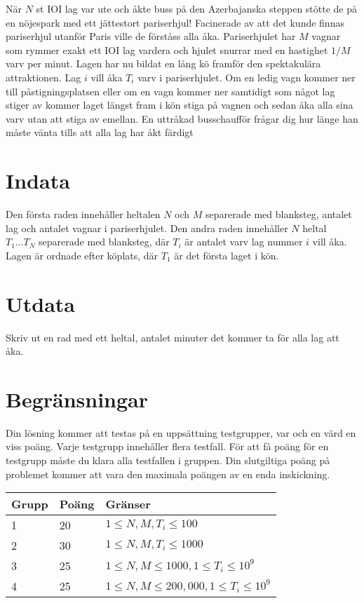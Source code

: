 När $N$ st IOI lag var ute och åkte buss på den Azerbajanska steppen stötte de på en nöjespark med ett jättestort pariserhjul! Facinerade av att det kunde finnas pariserhjul utanför Paris ville de förståss alla åka. Pariserhjulet har $M$ vagnar som rymmer exakt ett IOI lag vardera och hjulet snurrar med en hastighet $1/M$ varv per minut. Lagen har nu bildat en lång kö framför den spektakulära attraktionen. Lag $i$ vill åka $T_i$ varv i pariserhjulet. Om en ledig vagn kommer ner till påstigningsplatsen eller om en vagn kommer ner samtidigt som något lag stiger av kommer laget längst fram i kön stiga på vagnen och sedan åka alla sina varv utan att stiga av emellan.
En uttråkad busschaufför frågar dig hur länge han måste vänta tills att alla lag har åkt färdigt

\section*{Indata}
Den första raden innehåller heltalen $N$ och $M$ separerade med blanksteg,
antalet lag och antalet vagnar i pariserhjulet.
Den andra raden innehåller $N$ heltal $T_1 ... T_N$ separerade med blanksteg,
där $T_i$ är antalet varv lag nummer $i$ vill åka. Lagen är ordnade efter
köplats, där $T_1$ är det första laget i kön.

\section*{Utdata}
Skriv ut en rad med ett heltal, antalet minuter det kommer ta för alla lag att åka.

\section*{Begränsningar}
Din lösning kommer att testas på en uppsättning testgrupper, var och en värd en viss poäng.
Varje testgrupp innehåller flera testfall.
För att få poäng för en testgrupp måste du klara alla testfallen i gruppen.
Din slutgiltiga poäng på problemet kommer att vara den maximala poängen av en enda inskickning.

\noindent
\begin{tabular}{| l | l | l |}
\hline
Grupp & Poäng & Gränser \\ \hline
1     & 20    & $1 \le N, M, T_i \le 100$ \\ \hline
2     & 30    & $1 \le N, M, T_i \le 1000$ \\ \hline
3     & 25    & $1 \le N, M \le 1000, 1 \le T_i \le 10^9$ \\ \hline
4     & 25    & $1 \le N, M \le 200,000, 1 \le T_i \le 10^9$ \\ \hline
\end{tabular}
